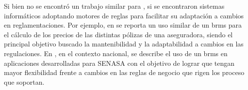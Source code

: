 
Si bien no se encontró un trabajo similar para , si se encontraron sistemas informáticos adoptando motores de reglas para facilitar su adaptación a cambios en reglamentaciones. 
Por ejemplo, en \cite{medic2019calculation} se reporta un uso similar de un \acrshort{brms} \cite{proctor2012drools} para el cálculo de los precios de las distintas pólizas de una aseguradora, siendo el principal objetivo buscado la mantenibilidad y la adaptabilidad a cambios en las regulaciones.
%
En \cite{sampol2019sistema}, en el contexto nacional, se describe el uso de un \acrshort{brms} en aplicaciones desarrolladas para SENASA con el objetivo de lograr que tengan mayor flexibilidad frente a cambios en las reglas de negocio que rigen los proceso que soportan.

